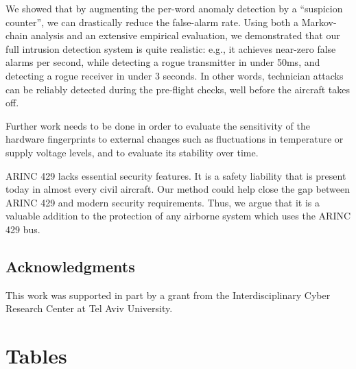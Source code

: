 \documentclass[english]{llncs}
\begin{document}
  We showed that by augmenting the per-word anomaly detection by a ``suspicion counter'', we can drastically reduce the false-alarm rate. Using both a Markov-chain analysis and an extensive empirical evaluation, we demonstrated that our full intrusion detection system is quite realistic: e.g., it achieves near-zero false alarms per second, while detecting a rogue transmitter in under 50ms, and detecting a rogue receiver in under 3 seconds. In other words, technician attacks can be reliably detected during the pre-flight checks, well before the aircraft takes off.
  
  Further work needs to be done in order to evaluate the sensitivity of the hardware fingerprints to external changes such as fluctuations in temperature or supply voltage levels, and to evaluate its stability over time.
  
  ARINC 429 lacks essential security features. It is a safety liability that is present today in almost every civil aircraft.
  Our method could help close the gap between ARINC 429 and modern security requirements. Thus, we argue that it is a valuable addition to the protection of any airborne system which uses the ARINC 429 bus.
 
\subsection*{Acknowledgments}
This work was supported in part by a grant from the Interdisciplinary Cyber Research Center at Tel Aviv University.


 

\appendix

\newpage
\section{Tables} \label{appendix:Tables}
\end{document}

